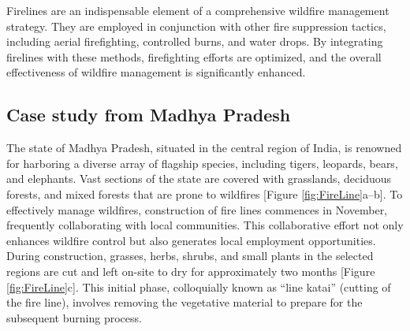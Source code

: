 \documentclass[
  12 pt,
]{Nemilov}
\begin{document}
Firelines are an indispensable element of a comprehensive wildfire management strategy. They are employed in conjunction with other fire suppression tactics, including aerial firefighting, controlled burns, and water drops. By integrating firelines with these methods, firefighting efforts are optimized, and the overall effectiveness of wildfire management is significantly enhanced.

\subsection{Case study from Madhya Pradesh}\label{case-study-from-madhya-pradesh}

The state of Madhya Pradesh, situated in the central region of India, is renowned for harboring a diverse array of flagship species, including tigers, leopards, bears, and elephants. Vast sections of the state are covered with grasslands, deciduous forests, and mixed forests that are prone to wildfires {[}Figure \ref{fig:FireLine}a--b{]}. To effectively manage wildfires, construction of fire lines commences in November, frequently collaborating with local communities. This collaborative effort not only enhances wildfire control but also generates local employment opportunities. During construction, grasses, herbs, shrubs, and small plants in the selected regions are cut and left on-site to dry for approximately two months {[}Figure \ref{fig:FireLine}c{]}. This initial phase, colloquially known as ``line katai'' (cutting of the fire line), involves removing the vegetative material to prepare for the subsequent burning process.
\end{document}
